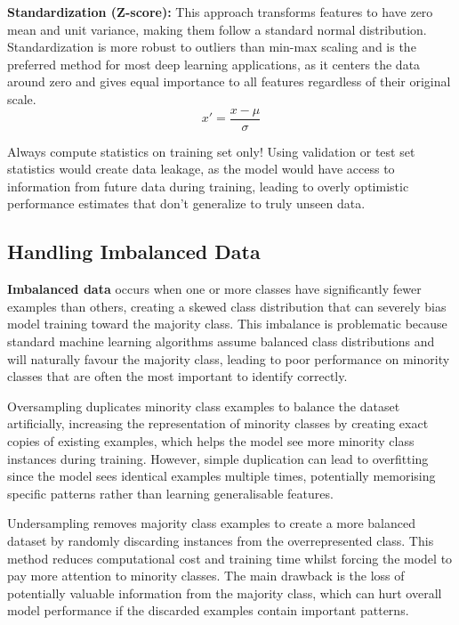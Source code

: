 \textbf{Standardization (Z-score):} This approach transforms features to have zero mean and unit variance, making them follow a standard normal distribution. Standardization is more robust to outliers than min-max scaling and is the preferred method for most deep learning applications, as it centers the data around zero and gives equal importance to all features regardless of their original scale.
\begin{equation}
x' = \frac{x - \mu}{\sigma}
\end{equation}

Always compute statistics on training set only!  Using validation or test set statistics would create data leakage, as the model would have access to information from future data during training, leading to overly optimistic performance estimates that don't generalize to truly unseen data.


\subsection{Handling Imbalanced Data}

\textbf{Imbalanced data} occurs when one or more classes have significantly fewer examples than others, creating a skewed class distribution that can severely bias model training toward the majority class. This imbalance is problematic because standard machine learning algorithms assume balanced class distributions and will naturally favour the majority class, leading to poor performance on minority classes that are often the most important to identify correctly.

Oversampling duplicates minority class examples to balance the dataset artificially, increasing the representation of minority classes by creating exact copies of existing examples, which helps the model see more minority class instances during training. However, simple duplication can lead to overfitting since the model sees identical examples multiple times, potentially memorising specific patterns rather than learning generalisable features.

Undersampling removes majority class examples to create a more balanced dataset by randomly discarding instances from the overrepresented class. This method reduces computational cost and training time whilst forcing the model to pay more attention to minority classes. The main drawback is the loss of potentially valuable information from the majority class, which can hurt overall model performance if the discarded examples contain important patterns.

